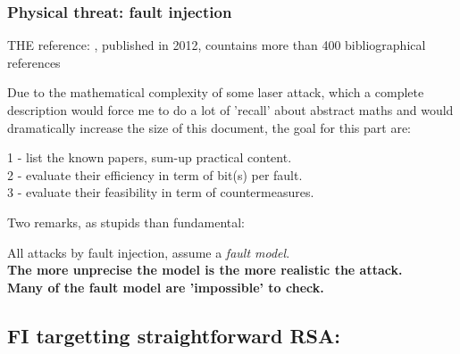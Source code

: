 \newpage
\subsubsection{Physical threat: fault injection}

THE reference: 
\cite{book-2012-joye}, published in 2012, countains more than 400 bibliographical references


Due to the mathematical complexity of some laser attack, 
which a complete description would force me to do a lot of 'recall' 
about abstract maths and would dramatically increase the size of 
this document, the goal for this part are:
\begin{center}
1 - list the known papers, sum-up practical content.\\
2 - evaluate their efficiency in term of bit(s) per fault.\\
3 - evaluate their feasibility in term of countermeasures.\\
\end{center}

Two remarks, as stupids than fundamental:
\begin{center}
	All attacks by fault injection, assume a \textit{fault model}.\\
	\textbf{
	The more unprecise the model is the more realistic the attack.\\
	Many of the fault model are 'impossible' to check.
}
\end{center}

\subsection*{FI targetting straightforward RSA:}
\begin{itemize}






\end{itemize}

